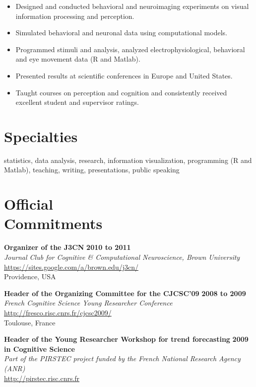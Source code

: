 \documentclass[margin,line]{resume}
\begin{document}
\begin{resume}
\begin{itemize}
  		\item Designed and conducted behavioral and neuroimaging experiments on visual information processing and perception.
  		\item Simulated behavioral and neuronal data using computational models.
  		\item Programmed stimuli and analysis, analyzed electrophysiological, behavioral and eye movement data (R and Matlab).
  		\item Presented results at scientific conferences in Europe and United States.
  		\item Taught courses on perception and cognition and consistently received excellent student and supervisor ratings.
	\end{itemize}
		
    \vspace{3mm}
    \section{\mysidestyle Specialties}
	statistics, data analysis, research,  information visualization, programming (R and Matlab), teaching, writing, presentations, public speaking


\newpage

\vspace{3mm}
    \section{\mysidestyle Official\\ Commitments} %

	\textbf{Organizer of the J3CN} \hfill \textbf{2010 to 2011}\\
	\textsl{Journal Club for Cognitive \& Computational Neuroscience, Brown University}\\
	 \url{https://sites.google.com/a/brown.edu/j3cn/}\\
	Providence, USA	

	\textbf{Header of the Organizing Committee for the CJCSC'09} \hfill \textbf{2008 to 2009}\\
	\textsl{French Cognitive Science Young Researcher Conference}\\
	 \url{http://fresco.risc.cnrs.fr/cjcsc2009/}\\
	Toulouse, France		

	\textbf{Header of the Young Researcher Workshop for trend forecasting} \hfill \textbf{2009}\\
	 \textbf{in Cognitive Science}\\
	\textsl{Part of the PIRSTEC project funded by the French National Research Agency (ANR)}\\
	 \url{http://pirstec.risc.cnrs.fr}


\end{resume}
\end{document}
